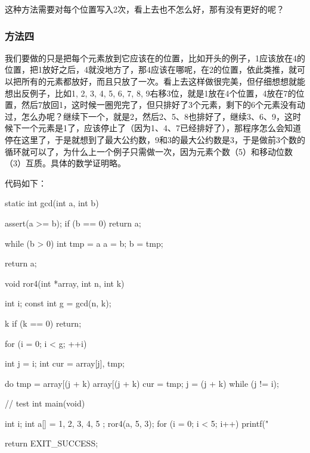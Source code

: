 这种方法需要对每个位置写入2次，看上去也不怎么好，那有没有更好的呢？

\subsubsection{方法四}
我们要做的只是把每个元素放到它应该在的位置，比如开头的例子，1应该放在4的位置，把1放好之后，4就没地方了，那4应该在哪呢，在2的位置，依此类推，就可以把所有的元素都放好，而且只放了一次。看上去这样做很完美，但仔细想想就能想出反例子，比如{1, 2, 3, 4, 5, 6, 7, 8, 9}右移3位，就是1放在4个位置，4放在7的位置，然后7放回1，这时候一圈兜完了，但只排好了3个元素，剩下的6个元素没有动过，怎么办呢？继续下一个，就是2，然后2、5、8也排好了，继续3、6、9，这时候下一个元素是1了，应该停止了（因为1、4、7已经排好了），那程序怎么会知道停在这里了，于是就想到了最大公约数，9和3的最大公约数是3，于是做前3个数的循环就可以了，为什么上一个例子只需做一次，因为元素个数（5）和移动位数（3）互质。具体的数学证明略。

代码如下：

\begin{Codex}[label=ror.c]
static int gcd(int a, int b) {
    assert(a >= b);
    if (b == 0) {
        return a;
    }

    while (b > 0) {
        int tmp = a %
        a = b;
        b = tmp;
    }

    return a;
}

void ror4(int *array, int n, int k) {
    int i;
    const int g = gcd(n, k);

    k %
    if (k == 0)
        return;

    for (i = 0; i < g; ++i) {
        int j = i;
        int cur = array[j], tmp;

        do {
            tmp = array[(j + k) %
            array[(j + k) %
            cur = tmp;
            j = (j + k) %
        } while (j != i);
    }
}

// test
int main(void) {
    int i;
    int a[] = { 1, 2, 3, 4, 5 };
    ror4(a, 5, 3);
    for (i = 0; i < 5; i++) {
        printf("%
    }

    return EXIT_SUCCESS;
}
\end{Codex}

